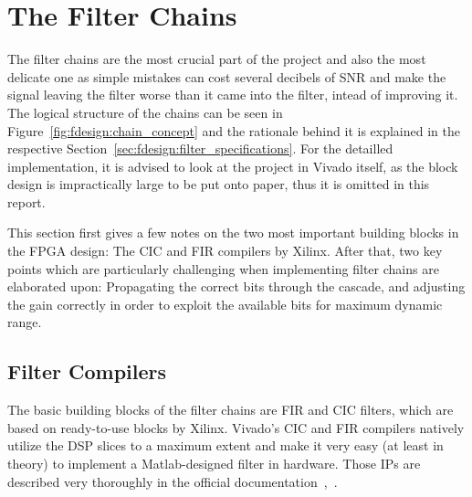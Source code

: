 \section{The Filter Chains} %
\label{sec:fpga:chains}
%
%
The filter chains are  the most crucial part of the project  and also the most
delicate  one  as  simple  mistakes  can cost  several  decibels  of  SNR  and
make  the signal  leaving  the filter  worse  than it  came  into the  filter,
intead  of improving  it.  The  logical structure  of the  chains can  be seen
in  Figure~\ref{fig:fdesign:chain_concept}  and  the rationale  behind  it  is
explained  in the  respective Section~\ref{sec:fdesign:filter_specifications}.
For the  detailled implementation,  it is  advised to look  at the  project in
Vivado  itself, as  the block  design is  impractically large  to be  put onto
paper, thus it is omitted in this report.

This section first gives a few notes on the two most important building blocks
in the FPGA design: The CIC and FIR  compilers by Xilinx.  After that, two key
points which are particularly challenging  when implementing filter chains are
elaborated  upon: Propagating  the  correct  bits  through  the  cascade,  and
adjusting  the gain  correctly  in order  to exploit  the  available bits  for
maximum dynamic range.

%
%
\subsection{Filter Compilers} %
\label{subsec:fpga:filter_compilers}

The  basic building  blocks of  the  filter chains  are FIR  and CIC  filters,
which  are  based on  ready-to-use  blocks  by  Xilinx. Vivado's CIC  and  FIR
compilers natively  utilize the  DSP slices  to a maximum  extent and  make it
very  easy  (at  least  in  theory)  to  implement  a  Matlab-designed  filter
in  hardware. Those  IPs  are  described   very  thoroughly  in  the  official
documentation~\cite{xilinx:fir-compiler},~\cite{xilinx:cic-compiler}.

